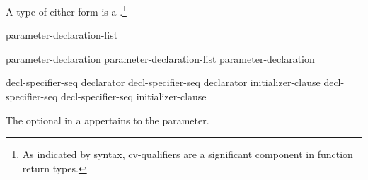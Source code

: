 \pnum
{}%
A type of either form is a .\footnote{As indicated by syntax, cv-qualifiers are a significant component in function return types.}

%
\begin{bnf}
\br
     \br
    parameter-declaration-list 
\end{bnf}

\begin{bnf}
\br
    parameter-declaration\br
    parameter-declaration-list \terminal{,} parameter-declaration
\end{bnf}

\begin{bnf}
\br
     decl-specifier-seq declarator\br
     decl-specifier-seq declarator \terminal{=} initializer-clause\br
     decl-specifier-seq \br
     decl-specifier-seq  \terminal{=} initializer-clause
\end{bnf}

The optional  in a 
appertains to the parameter.

